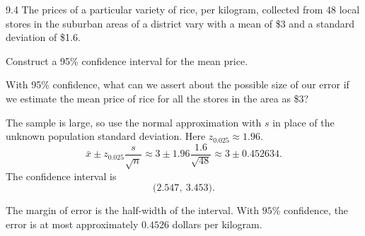 \documentclass[11pt,oneside]{article}
\begin{document}
\begin{exercise}{9.4}
The prices of a particular variety of rice, per kilogram, collected from 48 local stores in the suburban areas of a district vary with a mean of \$3 and a standard deviation of \$1.6.
\begin{exercisesubparts}
\item Construct a 95\% confidence interval for the mean price.
\item With 95\% confidence, what can we assert about the possible size of our error if we estimate the mean price of rice for all the stores in the area as \$3?
\end{exercisesubparts}
\end{exercise}
\begin{solution}
\begin{exercisesubparts}
\item The sample is large, so use the normal approximation with $s$ in place of the unknown population standard deviation. Here $z_{0.025}\approx 1.96$.
\[
\bar x\pm z_{0.025}\frac{s}{\sqrt n}\approx 3\pm 1.96\frac{1.6}{\sqrt{48}}\approx 3\pm 0.452634.
\]
The confidence interval is 
\[
\boxed{\bigl(2.547,\ 3.453\bigr)}.
\]

\item The margin of error is the half-width of the interval. With $95\%$ confidence, the error is at most approximately $\boxed{0.4526}$ dollars per kilogram.
\end{exercisesubparts}
\end{solution}
\end{document}
